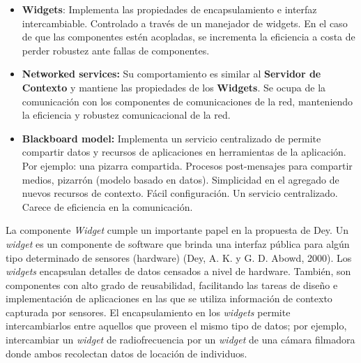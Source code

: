 \begin{itemize}
\begin{itemize}
\item \textbf{Widgets}: Implementa las propiedades de encapsulamiento e interfaz intercambiable. Controlado a través de un manejador de widgets. En el caso de que las componentes estén acopladas, se incrementa la eficiencia a costa de perder robustez ante fallas de componentes.

\item \textbf{Networked services:} Su comportamiento es similar al \textbf{Servidor de Contexto} y mantiene las propiedades de los \textbf{Widgets}. Se ocupa de la comunicación con los componentes de comunicaciones de la red, manteniendo la eficiencia y robustez comunicacional de la red.


\item \textbf{Blackboard model:} Implementa un servicio centralizado de permite compartir datos y recursos de aplicaciones en herramientas de la aplicación. Por ejemplo: una pizarra compartida. Procesos post-mensajes para compartir medios, pizarrón (modelo basado en datos). Simplicidad en el agregado de nuevos recursos de contexto.  Fácil configuración.  Un servicio centralizado.  Carece de eficiencia en la comunicación.

\end{itemize}

La componente \textit{Widget} cumple un importante papel en la propuesta de Dey. Un \textit{widget} es un componente de software que brinda una interfaz pública para algún tipo determinado de sensores (hardware) (Dey, A. K. y G. D. Abowd, 2000). Los \textit{widgets} encapsulan detalles de datos censados a nivel de hardware. También, son componentes con alto grado de reusabilidad, facilitando las tareas de diseño e implementación de aplicaciones en las que se utiliza información de contexto capturada por sensores. El encapsulamiento en los \textit{widgets} permite intercambiarlos entre aquellos que proveen el mismo tipo de datos; por ejemplo, intercambiar un \textit{widget} de radiofrecuencia por un \textit{widget} de una cámara filmadora donde ambos recolectan datos de locación de individuos.


\end{itemize}

